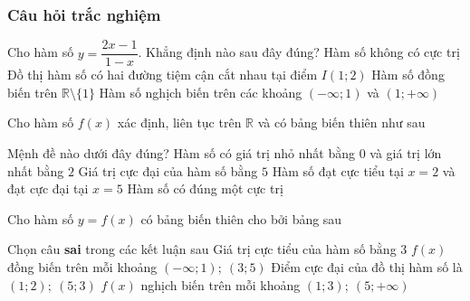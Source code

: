 \subsubsection{Câu hỏi trắc nghiệm}
\begin{ex}%
	Cho hàm số $y=\dfrac{2x-1}{1-x}$. Khẳng định nào sau đây đúng?
	\choice
	{\True  Hàm số không có cực trị}
	{Đồ thị hàm số có hai đường tiệm cận cắt nhau tại điểm $I(1;2)$}
	{Hàm số đồng biến trên $\mathbb{R}\setminus\{1\}$}
	{Hàm số nghịch biến trên các khoảng $(-\infty;1)$ và $(1;+\infty)$}
\end{ex}
\begin{ex}%
	Cho hàm số $f(x)$ xác định, liên tục trên $\mathbb{R}$ và có bảng biến thiên như sau
	\begin{center}
     \end{center}
	Mệnh đề nào dưới đây đúng?
	\choice
	{Hàm số có giá trị nhỏ nhất bằng $0$ và giá trị lớn nhất bằng $2$}
	{Giá trị cực đại của hàm số bằng $5$}
	{\True Hàm số đạt cực tiểu tại $x=2$ và đạt cực đại tại $x=5$}
	{Hàm số có đúng một cực trị}
\end{ex}
\begin{ex}%
	Cho hàm số $y=f(x)$ có bảng biến thiên cho bởi bảng sau
	\begin{center}
	\end{center}
	Chọn câu \textbf{sai} trong các kết luận sau
	\choice
	{\True Giá trị cực tiểu của hàm số bằng $3$}
	{$f(x)$ đồng biến trên mỗi khoảng $\left(-\infty;1\right);~ \left(3;5\right)$}
	{Điểm cực đại của đồ thị hàm số là $(1;2);~(5;3)$}
	{$f(x)$ nghịch biến trên mỗi khoảng $(1;3);~\left(5;+\infty\right)$}
\end{ex}
